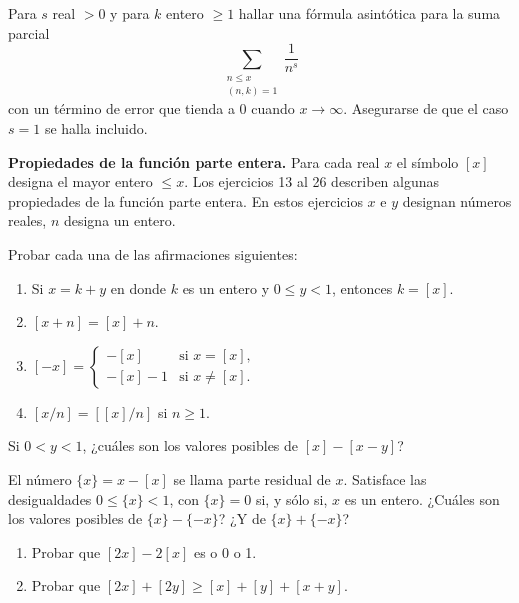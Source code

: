\documentclass[12pt,a4paper]{book}
\begin{document}
    \begin{ejercicio}
        Para $s$ real $>0$ y para $k$ entero $\geq1$ hallar una fórmula asintótica para
        la suma parcial
        \begin{equation*}
            \sum_{\substack{n\leq x\\ (n,k)=1}}\frac{1}{n^{s}}
        \end{equation*}
        con un término de error que tienda a 0 cuando $x\to\infty$. Asegurarse de que el
        caso $s=1$ se halla incluido.
    \end{ejercicio}

    \textbf{Propiedades de la función parte entera.} Para cada real $x$ el símbolo $[x]$
    designa el mayor entero $\leq x$. Los ejercicios 13 al 26 describen algunas
    propiedades de la función parte entera. En estos ejercicios $x$ e $y$ designan números
    reales, $n$ designa un entero.

    \begin{ejercicio}
        Probar cada una de las afirmaciones siguientes:
        \begin{enumerate}
            \item[(a)] Si $x=k+y$ en donde $k$ es un entero y $0\leq y<1$, entonces
            $k=[x]$.
            \item[(b)] $[x+n]=[x]+n$.
            \item[(c)] $[-x]=\begin{cases}-[x] & \text{si } x=[x],\\
            -[x]-1 & \text{si } x\neq[x].\end{cases}$
            \item[(d)] $[x/n]=[[x]/n]$ si $n\geq1$.
        \end{enumerate}
    \end{ejercicio}

    \begin{ejercicio}
        Si $0<y<1$, ¿cuáles son los valores posibles de $[x]-[x-y]$?
    \end{ejercicio}

    \begin{ejercicio}
        El número $\{x\}=x-[x]$ se llama parte residual de $x$. Satisface las
        desigualdades $0\leq\{x\}<1$, con $\{x\}=0$ si, y sólo si, $x$ es un entero.
        ¿Cuáles son los valores posibles de $\{x\}-\{-x\}$? ¿Y de $\{x\}+\{-x\}$?
    \end{ejercicio}

    \begin{ejercicio}
        \begin{enumerate}
            \item[(a)] Probar que $[2x]-2[x]$ es o 0 o 1.
            \item[(b)] Probar que $[2x]+[2y]\geq[x]+[y]+[x+y]$.
        \end{enumerate}
    \end{ejercicio}
\end{document}
